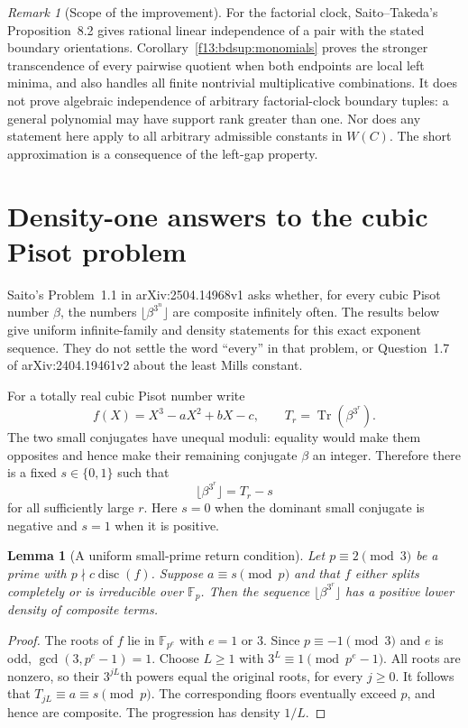 \documentclass[11pt,a4paper]{article}
\newtheorem{lemma}[theorem]{Lemma}
\theoremstyle{definition}
\theoremstyle{remark}
\newtheorem{remark}[theorem]{Remark}
\numberwithin{equation}{section}
\begin{document}
\begin{remark}[Scope of the improvement]
For the factorial clock, Saito--Takeda's Proposition~8.2 gives rational
linear independence of a pair with the stated boundary orientations.
Corollary~\ref{f13:bdsup:monomials} proves the stronger transcendence of every
pairwise quotient when both endpoints are local left minima, and also
handles all finite nontrivial multiplicative combinations.
It does not prove algebraic independence of arbitrary factorial-clock
boundary tuples: a general polynomial may have support rank greater
than one. Nor does any statement here apply to all arbitrary admissible
constants in $W(C)$. The short approximation is a consequence of the
left-gap property.
\end{remark}


\section{Density-one answers to the cubic Pisot problem}
\label{f13:sec:r2-cubic}

Saito's Problem~1.1 in arXiv:2504.14968v1 asks whether, for every
cubic Pisot number $\beta$, the numbers $\lfloor\beta^{3^n}\rfloor$
are composite infinitely often. The results below give uniform
infinite-family and density statements for this exact exponent
sequence. They do not settle the word ``every'' in that problem,
or Question~1.7 of arXiv:2404.19461v2 about the least Mills constant.

For a totally real cubic Pisot number write
\[
 f(X)=X^3-aX^2+bX-c,
 \qquad T_r=\operatorname{Tr}(\beta^{3^r}).
\]
The two small conjugates have unequal moduli: equality would make
them opposites and hence make their remaining conjugate $\beta$
an integer. Therefore there is a fixed $s\in\{0,1\}$ such that
\[
 \lfloor\beta^{3^r}\rfloor=T_r-s
\]
for all sufficiently large $r$. Here $s=0$ when the dominant small
conjugate is negative and $s=1$ when it is positive.

\begin{lemma}[A uniform small-prime return condition]
\label{f13:lem:r2-return}
Let $p\equiv2\pmod3$ be a prime with $p\nmid c\operatorname{disc}(f)$.
Suppose $a\equiv s\pmod p$ and that $f$ either splits completely
or is irreducible over $\mathbb F_p$. Then the sequence
$\lfloor\beta^{3^r}\rfloor$ has a positive lower density of
composite terms.
\end{lemma}
\begin{proof}
The roots of $f$ lie in $\mathbb F_{p^e}$ with $e=1$ or $3$.
Since $p\equiv-1\pmod3$ and $e$ is odd,
$\gcd(3,p^e-1)=1$. Choose $L\ge1$ with
$3^L\equiv1\pmod{p^e-1}$. All roots are nonzero, so their
$3^{jL}$th powers equal the original roots, for every $j\ge0$.
It follows that $T_{jL}\equiv a\equiv s\pmod p$.
The corresponding floors eventually exceed $p$, and hence are
composite. The progression has density $1/L$.
\end{proof}
\end{document}
